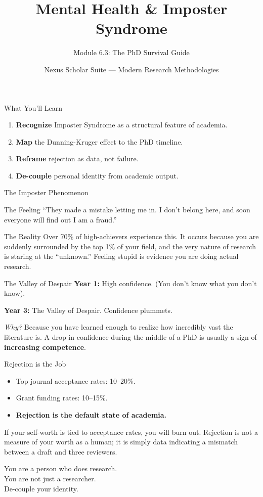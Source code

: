 \documentclass[aspectratio=169]{beamer}
\title{Mental Health \& Imposter Syndrome}
\subtitle{Module 6.3: The PhD Survival Guide}
\author{Nexus Scholar Suite --- Modern Research Methodologies}
\date{}
\begin{document}
\begin{frame}[plain]
  \titlepage
\end{frame}

\begin{frame}{What You'll Learn}
  \begin{enumerate}
    \item \textbf{Recognize} Imposter Syndrome as a structural feature of academia.
    \item \textbf{Map} the Dunning-Kruger effect to the PhD timeline.
    \item \textbf{Reframe} rejection as data, not failure.
    \item \textbf{De-couple} personal identity from academic output.
  \end{enumerate}
\end{frame}

\begin{frame}{The Imposter Phenomenon}
  \begin{alertblock}{The Feeling}
    ``They made a mistake letting me in. I don't belong here, and soon everyone will find out I am a fraud.''
  \end{alertblock}
  \vspace{0.3cm}
  \begin{exampleblock}{The Reality}
    Over 70\% of high-achievers experience this. It occurs because you are suddenly surrounded by the top 1\% of your field, and the very nature of research is staring at the ``unknown.'' Feeling stupid is evidence you are doing actual research.
  \end{exampleblock}
\end{frame}

\begin{frame}{The Valley of Despair}
  \textbf{Year 1:} High confidence. (You don't know what you don't know).
  
  \textbf{Year 3:} The Valley of Despair. Confidence plummets. 
  
  \vspace{0.5cm}
  \textit{Why?} Because you have learned enough to realize how incredibly vast the literature is. A drop in confidence during the middle of a PhD is usually a sign of \textbf{increasing competence}.
\end{frame}

\begin{frame}{Rejection is the Job}
  \begin{itemize}
    \item Top journal acceptance rates: 10--20\%.
    \item Grant funding rates: 10--15\%.
    \item \textbf{Rejection is the default state of academia.}
  \end{itemize}
  \vspace{0.3cm}
  If your self-worth is tied to acceptance rates, you will burn out. Rejection is not a measure of your worth as a human; it is simply data indicating a mismatch between a draft and three reviewers.
\end{frame}

\begin{frame}[standout]
  You are a person who does research.\\
  You are not just a researcher.\\
  De-couple your identity.
\end{frame}
\end{document}
